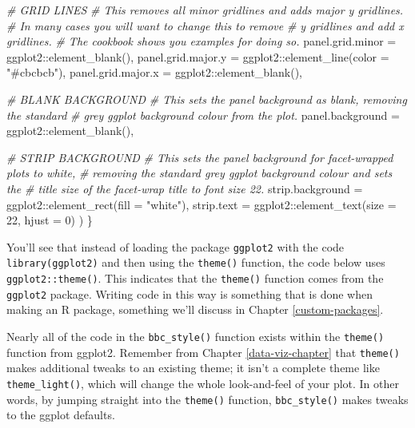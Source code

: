 \documentclass[
]{book}
\newenvironment{Shaded}{\begin{snugshade}}{\end{snugshade}}
\newcommand{\AttributeTok}[1]{\textcolor[rgb]{0.77,0.63,0.00}{#1}}
\newcommand{\CommentTok}[1]{\textcolor[rgb]{0.56,0.35,0.01}{\textit{#1}}}
\newcommand{\DecValTok}[1]{\textcolor[rgb]{0.00,0.00,0.81}{#1}}
\newcommand{\FunctionTok}[1]{\textcolor[rgb]{0.00,0.00,0.00}{#1}}
\newcommand{\NormalTok}[1]{#1}
\newcommand{\SpecialCharTok}[1]{\textcolor[rgb]{0.00,0.00,0.00}{#1}}
\newcommand{\StringTok}[1]{\textcolor[rgb]{0.31,0.60,0.02}{#1}}
\begin{document}
\begin{Shaded}
\begin{Highlighting}[]
    \CommentTok{\# GRID LINES}
    \CommentTok{\# This removes all minor gridlines and adds major y gridlines.}
    \CommentTok{\# In many cases you will want to change this to remove }
    \CommentTok{\# y gridlines and add x gridlines.}
    \CommentTok{\# The cookbook shows you examples for doing so.}
    \AttributeTok{panel.grid.minor =}\NormalTok{ ggplot2}\SpecialCharTok{::}\FunctionTok{element\_blank}\NormalTok{(),}
    \AttributeTok{panel.grid.major.y =}\NormalTok{ ggplot2}\SpecialCharTok{::}\FunctionTok{element\_line}\NormalTok{(}\AttributeTok{color =} \StringTok{"\#cbcbcb"}\NormalTok{),}
    \AttributeTok{panel.grid.major.x =}\NormalTok{ ggplot2}\SpecialCharTok{::}\FunctionTok{element\_blank}\NormalTok{(),}
    
    \CommentTok{\# BLANK BACKGROUND}
    \CommentTok{\# This sets the panel background as blank, removing the standard }
    \CommentTok{\# grey ggplot background colour from the plot.}
    \AttributeTok{panel.background =}\NormalTok{ ggplot2}\SpecialCharTok{::}\FunctionTok{element\_blank}\NormalTok{(),}
    
    \CommentTok{\# STRIP BACKGROUND}
    \CommentTok{\# This sets the panel background for facet{-}wrapped plots to white,}
    \CommentTok{\# removing the standard grey ggplot background colour and sets the }
    \CommentTok{\# title size of the facet{-}wrap title to font size 22.}
    \AttributeTok{strip.background =}\NormalTok{ ggplot2}\SpecialCharTok{::}\FunctionTok{element\_rect}\NormalTok{(}\AttributeTok{fill =} \StringTok{"white"}\NormalTok{),}
    \AttributeTok{strip.text =}\NormalTok{ ggplot2}\SpecialCharTok{::}\FunctionTok{element\_text}\NormalTok{(}\AttributeTok{size =} \DecValTok{22}\NormalTok{, }\AttributeTok{hjust =} \DecValTok{0}\NormalTok{)}
\NormalTok{  )}
\NormalTok{\}}
\end{Highlighting}
\end{Shaded}

You'll see that instead of loading the package \texttt{ggplot2} with the code \texttt{library(ggplot2)} and then using the \texttt{theme()} function, the code below uses \texttt{ggplot2::theme()}. This indicates that the \texttt{theme()} function comes from the \texttt{ggplot2} package. Writing code in this way is something that is done when making an R package, something we'll discuss in Chapter \ref{custom-packages}.

Nearly all of the code in the \texttt{bbc\_style()} function exists within the \texttt{theme()} function from ggplot2. Remember from Chapter \ref{data-viz-chapter} that \texttt{theme()} makes additional tweaks to an existing theme; it isn't a complete theme like \texttt{theme\_light()}, which will change the whole look-and-feel of your plot. In other words, by jumping straight into the \texttt{theme()} function, \texttt{bbc\_style()} makes tweaks to the ggplot defaults.
\end{document}
